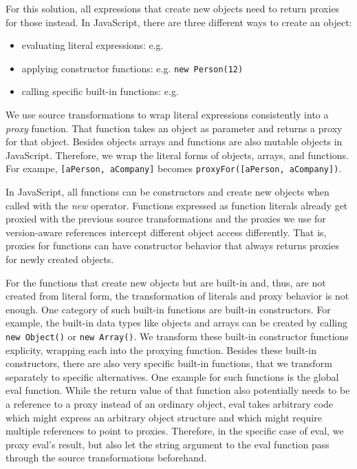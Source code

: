 For this solution, all expressions that create new objects need to return proxies for those instead.
In JavaScript, there are three different ways to create an object: 
\begin{itemize}
    \item evaluating literal expressions: e.g. %
    \item applying constructor functions: e.g. \lstinline{new Person(12)}
    \item calling specific built-in functions: e.g. %
\end{itemize}

We use source transformations to wrap literal expressions consistently into a \emph{proxy} function.
That function takes an object as parameter and returns a proxy for that object.
Besides objects arrays and functions are also mutable objects in JavaScript.
Therefore, we wrap the literal forms of objects, arrays, and functions.
For exampe, \lstinline{[aPerson, aCompany]} becomes \lstinline{proxyFor([aPerson, aCompany])}.

In JavaScript, all functions can be constructors and create new objects when called with the \emph{new} operator.
Functions expressed as function literals already get proxied with the previous source transformations and the proxies we use for version-aware references intercept different object access differently.
That is, proxies for functions can have constructor behavior that always returns proxies for newly created objects.

For the functions that create new objects but are built-in and, thus, are not created from literal form, the transformation of literals and proxy behavior is not enough.
One category of such built-in functions are built-in constructors.
For example, the built-in data types like objects and arrays can be created by calling \lstinline{new Object()} or \lstinline{new Array()}.
We transform these built-in constructor functions explicity, wrapping each into the proxying function.
Besides these built-in constructors, there are also very specific built-in functions, that we transform separately to specific alternatives.
One example for such functions is the global eval function.
While the return value of that function also potentially needs to be a reference to a proxy instead of an ordinary object, eval takes arbitrary code which might express an arbitrary object structure and which might require multiple references to point to proxies.
Therefore, in the specific case of eval, we proxy eval's result, but also let the string argument to the eval function pass through the source transformations beforehand.

